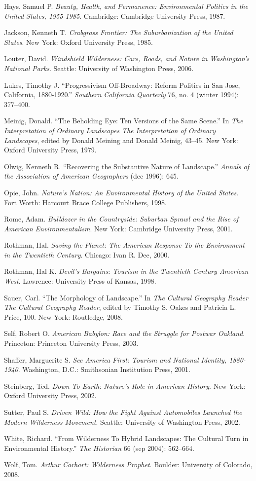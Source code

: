 \documentclass[11pt,article,oneside]{memoir}
\begin{document}
Hays, Samuel P. \emph{Beauty, Health, and Permanence: Environmental
Politics in the United States, 1955-1985}. Cambridge: Cambridge
University Press, 1987.

Jackson, Kenneth T. \emph{Crabgrass Frontier: The Suburbanization of the
United States}. New York: Oxford University Press, 1985.

Louter, David. \emph{Windshield Wilderness: Cars, Roads, and Nature in
Washington's National Parks}. Seattle: University of Washington Press,
2006.

Lukes, Timothy J. ``Progressivism Off-Broadway: Reform Politics in San
Jose, California, 1880-1920.'' \emph{Southern California Quarterly} 76,
no. 4 (winter 1994): 377--400.

Meinig, Donald. ``The Beholding Eye: Ten Versions of the Same Scene.''
In \emph{The Interpretation of Ordinary Landscapes The Interpretation of
Ordinary Landscapes}, edited by Donald Meining and Donald Meinig,
43--45. New York: Oxford University Press, 1979.

Olwig, Kenneth R. ``Recovering the Substantive Nature of Landscape.''
\emph{Annals of the Association of American Geographers} (dec 1996):
645.

Opie, John. \emph{Nature's Nation: An Environmental History of the
United States}. Fort Worth: Harcourt Brace College Publishers, 1998.

Rome, Adam. \emph{Bulldozer in the Countryside: Suburban Sprawl and the
Rise of American Environmentalism}. New York: Cambridge University
Press, 2001.

Rothman, Hal. \emph{Saving the Planet: The American Response To the
Environment in the Twentieth Century}. Chicago: Ivan R. Dee, 2000.

Rothman, Hal K. \emph{Devil's Bargains: Tourism in the Twentieth Century
American West}. Lawrence: University Press of Kansas, 1998.

Sauer, Carl. ``The Morphology of Landscape.'' In \emph{The Cultural
Geography Reader The Cultural Geography Reader}, edited by Timothy S.
Oakes and Patricia L. Price, 100. New York: Routledge, 2008.

Self, Robert O. \emph{American Babylon: Race and the Struggle for
Postwar Oakland}. Princeton: Princeton University Press, 2003.

Shaffer, Marguerite S. \emph{See America First: Tourism and National
Identity, 1880-1940}. Washington, D.C.: Smithsonian Institution Press,
2001.

Steinberg, Ted. \emph{Down To Earth: Nature's Role in American History}.
New York: Oxford University Press, 2002.

Sutter, Paul S. \emph{Driven Wild: How the Fight Against Automobiles
Launched the Modern Wilderness Movement}. Seattle: University of
Washington Press, 2002.

White, Richard. ``From Wilderness To Hybrid Landscapes: The Cultural
Turn in Environmental History.'' \emph{The Historian} 66 (sep 2004):
562--664.

Wolf, Tom. \emph{Arthur Carhart: Wilderness Prophet}. Boulder:
University of Colorado, 2008.
\end{document}
